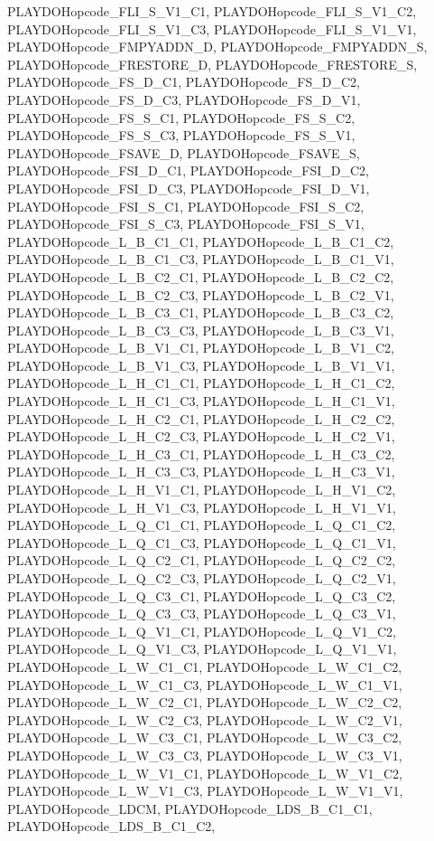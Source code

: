 PLAYDOHopcode\_\-FLI\_\-S\_\-V1\_\-C1, PLAYDOHopcode\_\-FLI\_\-S\_\-V1\_\-C2, PLAYDOHopcode\_\-FLI\_\-S\_\-V1\_\-C3, PLAYDOHopcode\_\-FLI\_\-S\_\-V1\_\-V1, PLAYDOHopcode\_\-FMPYADDN\_\-D, PLAYDOHopcode\_\-FMPYADDN\_\-S, PLAYDOHopcode\_\-FRESTORE\_\-D, PLAYDOHopcode\_\-FRESTORE\_\-S, PLAYDOHopcode\_\-FS\_\-D\_\-C1, PLAYDOHopcode\_\-FS\_\-D\_\-C2, PLAYDOHopcode\_\-FS\_\-D\_\-C3, PLAYDOHopcode\_\-FS\_\-D\_\-V1, PLAYDOHopcode\_\-FS\_\-S\_\-C1, PLAYDOHopcode\_\-FS\_\-S\_\-C2, PLAYDOHopcode\_\-FS\_\-S\_\-C3, PLAYDOHopcode\_\-FS\_\-S\_\-V1, PLAYDOHopcode\_\-FSAVE\_\-D, PLAYDOHopcode\_\-FSAVE\_\-S, PLAYDOHopcode\_\-FSI\_\-D\_\-C1, PLAYDOHopcode\_\-FSI\_\-D\_\-C2, PLAYDOHopcode\_\-FSI\_\-D\_\-C3, PLAYDOHopcode\_\-FSI\_\-D\_\-V1, PLAYDOHopcode\_\-FSI\_\-S\_\-C1, PLAYDOHopcode\_\-FSI\_\-S\_\-C2, PLAYDOHopcode\_\-FSI\_\-S\_\-C3, PLAYDOHopcode\_\-FSI\_\-S\_\-V1, PLAYDOHopcode\_\-L\_\-B\_\-C1\_\-C1, PLAYDOHopcode\_\-L\_\-B\_\-C1\_\-C2, PLAYDOHopcode\_\-L\_\-B\_\-C1\_\-C3, PLAYDOHopcode\_\-L\_\-B\_\-C1\_\-V1, PLAYDOHopcode\_\-L\_\-B\_\-C2\_\-C1, PLAYDOHopcode\_\-L\_\-B\_\-C2\_\-C2, PLAYDOHopcode\_\-L\_\-B\_\-C2\_\-C3, PLAYDOHopcode\_\-L\_\-B\_\-C2\_\-V1, PLAYDOHopcode\_\-L\_\-B\_\-C3\_\-C1, PLAYDOHopcode\_\-L\_\-B\_\-C3\_\-C2, PLAYDOHopcode\_\-L\_\-B\_\-C3\_\-C3, PLAYDOHopcode\_\-L\_\-B\_\-C3\_\-V1, PLAYDOHopcode\_\-L\_\-B\_\-V1\_\-C1, PLAYDOHopcode\_\-L\_\-B\_\-V1\_\-C2, PLAYDOHopcode\_\-L\_\-B\_\-V1\_\-C3, PLAYDOHopcode\_\-L\_\-B\_\-V1\_\-V1, PLAYDOHopcode\_\-L\_\-H\_\-C1\_\-C1, PLAYDOHopcode\_\-L\_\-H\_\-C1\_\-C2, PLAYDOHopcode\_\-L\_\-H\_\-C1\_\-C3, PLAYDOHopcode\_\-L\_\-H\_\-C1\_\-V1, PLAYDOHopcode\_\-L\_\-H\_\-C2\_\-C1, PLAYDOHopcode\_\-L\_\-H\_\-C2\_\-C2, PLAYDOHopcode\_\-L\_\-H\_\-C2\_\-C3, PLAYDOHopcode\_\-L\_\-H\_\-C2\_\-V1, PLAYDOHopcode\_\-L\_\-H\_\-C3\_\-C1, PLAYDOHopcode\_\-L\_\-H\_\-C3\_\-C2, PLAYDOHopcode\_\-L\_\-H\_\-C3\_\-C3, PLAYDOHopcode\_\-L\_\-H\_\-C3\_\-V1, PLAYDOHopcode\_\-L\_\-H\_\-V1\_\-C1, PLAYDOHopcode\_\-L\_\-H\_\-V1\_\-C2, PLAYDOHopcode\_\-L\_\-H\_\-V1\_\-C3, PLAYDOHopcode\_\-L\_\-H\_\-V1\_\-V1, PLAYDOHopcode\_\-L\_\-Q\_\-C1\_\-C1, PLAYDOHopcode\_\-L\_\-Q\_\-C1\_\-C2, PLAYDOHopcode\_\-L\_\-Q\_\-C1\_\-C3, PLAYDOHopcode\_\-L\_\-Q\_\-C1\_\-V1, PLAYDOHopcode\_\-L\_\-Q\_\-C2\_\-C1, PLAYDOHopcode\_\-L\_\-Q\_\-C2\_\-C2, PLAYDOHopcode\_\-L\_\-Q\_\-C2\_\-C3, PLAYDOHopcode\_\-L\_\-Q\_\-C2\_\-V1, PLAYDOHopcode\_\-L\_\-Q\_\-C3\_\-C1, PLAYDOHopcode\_\-L\_\-Q\_\-C3\_\-C2, PLAYDOHopcode\_\-L\_\-Q\_\-C3\_\-C3, PLAYDOHopcode\_\-L\_\-Q\_\-C3\_\-V1, PLAYDOHopcode\_\-L\_\-Q\_\-V1\_\-C1, PLAYDOHopcode\_\-L\_\-Q\_\-V1\_\-C2, PLAYDOHopcode\_\-L\_\-Q\_\-V1\_\-C3, PLAYDOHopcode\_\-L\_\-Q\_\-V1\_\-V1, PLAYDOHopcode\_\-L\_\-W\_\-C1\_\-C1, PLAYDOHopcode\_\-L\_\-W\_\-C1\_\-C2, PLAYDOHopcode\_\-L\_\-W\_\-C1\_\-C3, PLAYDOHopcode\_\-L\_\-W\_\-C1\_\-V1, PLAYDOHopcode\_\-L\_\-W\_\-C2\_\-C1, PLAYDOHopcode\_\-L\_\-W\_\-C2\_\-C2, PLAYDOHopcode\_\-L\_\-W\_\-C2\_\-C3, PLAYDOHopcode\_\-L\_\-W\_\-C2\_\-V1, PLAYDOHopcode\_\-L\_\-W\_\-C3\_\-C1, PLAYDOHopcode\_\-L\_\-W\_\-C3\_\-C2, PLAYDOHopcode\_\-L\_\-W\_\-C3\_\-C3, PLAYDOHopcode\_\-L\_\-W\_\-C3\_\-V1, PLAYDOHopcode\_\-L\_\-W\_\-V1\_\-C1, PLAYDOHopcode\_\-L\_\-W\_\-V1\_\-C2, PLAYDOHopcode\_\-L\_\-W\_\-V1\_\-C3, PLAYDOHopcode\_\-L\_\-W\_\-V1\_\-V1, PLAYDOHopcode\_\-LDCM, PLAYDOHopcode\_\-LDS\_\-B\_\-C1\_\-C1, PLAYDOHopcode\_\-LDS\_\-B\_\-C1\_\-C2, 